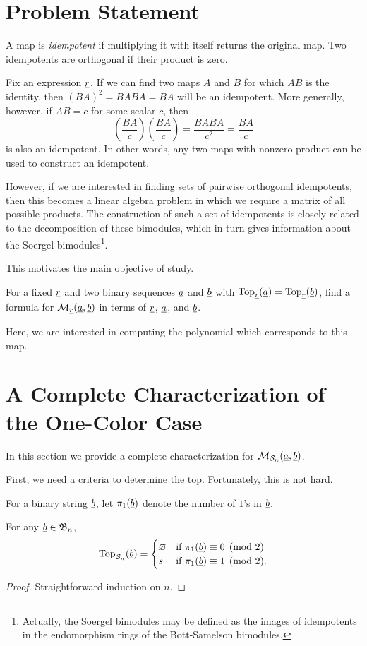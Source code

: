 \section{Problem Statement}
\label{sec:probstate}
\begin{definition}
	A map is \emph{idempotent} if multiplying it with itself returns the original map.  Two idempotents are orthogonal if their product is zero.
\end{definition}
Fix an expression $\underline{r}$.  If we can find two maps $A$ and $B$ for which $AB$ is the identity, then $(BA)^2=BABA=BA$ will be an idempotent.  More generally, however, if $AB = c$ for some scalar $c$, then \[ \left( \frac{BA}{c} \right)\left( \frac{BA}{c} \right) = \frac{BABA}{c^2} = \frac{BA}{c} \] is also an idempotent.  In other words, any two maps with nonzero product can be used to construct an idempotent.

However, if we are interested in finding sets of pairwise orthogonal idempotents, then this becomes a linear algebra problem in which we require a matrix of all possible products.  The construction of such a set of idempotents is closely related to the decomposition of these bimodules, which in turn gives information about the Soergel bimodules\footnote{Actually, the Soergel bimodules may be defined as the images of idempotents in the endomorphism rings of the Bott-Samelson bimodules.}.

This motivates the main objective of study.
\begin{ques*}
	For a fixed $\underline{r}$ and two binary sequences $\underline{a}$ and $\underline{b}$ with $\operatorname{Top}_{\underline{r}}(\underline{a}) = \operatorname{Top}_{\underline{r}}(\underline{b})$, find a formula for $\mathcal M_{\underline{r}}(\underline{a}, \underline{b})$ in terms of $\underline{r}$, $\underline{a}$, and $\underline{b}$.
\end{ques*}
Here, we are interested in computing the polynomial which corresponds to this map.

\section{A Complete Characterization of the One-Color Case}
\label{sec:res_onecolor}
In this section we provide a complete characterization for $\mathcal M_{\mathcal S_n}(\underline{a}, \underline{b})$.  %

First, we need a criteria to determine the top.  Fortunately, this is not hard.
\begin{definition}
	For a binary string $\underline{b}$, let $\pi_1(\underline{b})$ denote the number of $1$'s in $\underline{b}$.
\end{definition}
\begin{proposition}
	For any $\underline{b} \in \mathfrak B_n$, \[
		\operatorname{Top}_{\mathcal S_n}(\underline{b}) =
		\begin{cases}
			\varnothing & \text{if } \pi_1(\underline{b}) \equiv 0 \pmod{2} \\
			s & \text{if } \pi_1(\underline{b}) \equiv 1 \pmod{2}.
		\end{cases}
		\]
	\label{prop:s_top}
\end{proposition}
\begin{proof}
	Straightforward induction on $n$.  
\end{proof}


